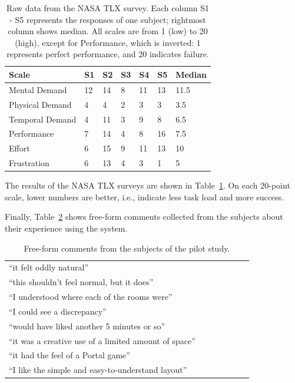 \documentclass{sigchi}
\begin{document}
\begin{table}[]
\begin{tabular}{lllllll}
\toprule
Scale & S1 & S2 & S3 & S4 & S5 & Median \\ \midrule
Mental Demand & 12 & 14 & 8 & 11 & 13 & 11.5 \\
Physical Demand & 4 & 4 & 2 & 3 & 3 & 3.5 \\
Temporal Demand & 4 & 11 & 3 & 9 & 8 & 6.5 \\
Performance & 7 & 14 & 4 & 8 & 16 & 7.5 \\
Effort & 6 & 15 & 9 & 11 & 13 & 10 \\
Frustration & 6 & 13 & 4 & 3 & 1 & 5 \\ \bottomrule
\end{tabular}
\caption{Raw data from the NASA TLX survey.  Each column S1 - S5 represents the responses of one subject; rightmost column shows median.  All scales are from 1 (low) to 20 (high), except for Performance, which is inverted: 1 represents perfect performance, and 20 indicates failure.}
\label{table:nasaTLX}
\end{table}

The results of the NASA TLX surveys are shown in Table~\ref{table:nasaTLX}.  On each 20-point scale, lower numbers are better, i.e., indicate less task load and more success.

Finally, Table~\ref{table:comments} shows free-form comments collected from the subjects about their experience using the system.

\begin{table}[]
\begin{tabular}{lllllll}
\toprule
“it felt oddly natural” \\
“this shouldn’t feel normal, but it does” \\
“I understood where each of the rooms were” \\
“I could see a discrepancy” \\
“would have liked another 5 minutes or so” \\
“it was a creative use of a limited amount of space” \\
“it had the feel of a Portal game” \\
“I like the simple and easy-to-understand layout” \\
\bottomrule
\end{tabular}
\caption{Free-form comments from the subjects of the pilot study.}
\label{table:comments}
\end{table}
\end{document}
